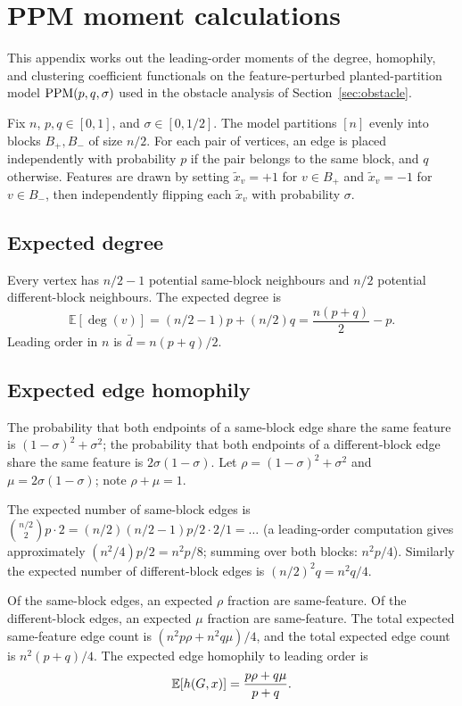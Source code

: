 
\section{PPM moment calculations}\label{app:ppm-moments}

This appendix works out the leading-order moments of the
degree, homophily, and clustering coefficient functionals on the
feature-perturbed planted-partition model $\mathrm{PPM}(p, q, \sigma)$ used
in the obstacle analysis of Section~\ref{sec:obstacle}.

Fix $n$, $p, q \in [0, 1]$, and $\sigma \in [0, 1/2]$. The model
partitions $[n]$ evenly into blocks $B_+, B_-$ of size $n/2$. For
each pair of vertices, an edge is placed independently with
probability $p$ if the pair belongs to the same block, and $q$
otherwise. Features are drawn by setting $\tilde x_v = +1$ for $v
\in B_+$ and $\tilde x_v = -1$ for $v \in B_-$, then independently
flipping each $\tilde x_v$ with probability $\sigma$.

\subsection*{Expected degree}

Every vertex has $n/2 - 1$ potential same-block neighbours and
$n/2$ potential different-block neighbours. The expected degree is
\[
\mathbb{E}[\deg(v)] = (n/2 - 1) p + (n/2) q = \frac{n(p + q)}{2} -
p.
\]
Leading order in $n$ is $\bar d = n(p + q)/2$.

\subsection*{Expected edge homophily}

The probability that both endpoints of a same-block edge share the
same feature is $(1 - \sigma)^2 + \sigma^2$; the probability that
both endpoints of a different-block edge share the same feature is
$2\sigma(1 - \sigma)$. Let $\rho = (1-\sigma)^2 + \sigma^2$ and
$\mu = 2\sigma(1-\sigma)$; note $\rho + \mu = 1$.

The expected number of same-block edges is $\binom{n/2}{2} p \cdot 2 =
(n/2)(n/2 - 1) p / 2 \cdot 2 / 1 = \ldots$ (a leading-order
computation gives approximately $(n^2/4) p / 2 = n^2 p / 8$; summing
over both blocks: $n^2 p / 4$). Similarly the expected number of
different-block edges is $(n/2)^2 q = n^2 q / 4$.

Of the same-block edges, an expected $\rho$ fraction are same-feature.
Of the different-block edges, an expected $\mu$ fraction are
same-feature. The total expected same-feature edge count is $(n^2 p
\rho + n^2 q \mu) / 4$, and the total expected edge count is $n^2 (p
+ q) / 4$. The expected edge homophily to leading order is
\[
\mathbb{E}[h(G, x)] = \frac{p \rho + q \mu}{p + q}.
\]

